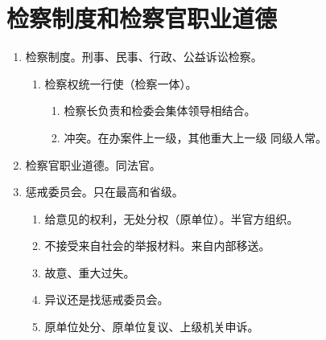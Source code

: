 \section{检察制度和检察官职业道德}
\begin{enumerate}
  \item 检察制度。刑事、民事、行政、公益诉讼检察。
        \begin{enumerate}
          \item 检察权统一行使（检察一体）。
                \begin{enumerate}
                  \item 检察长负责和检委会集体领导相结合。
                  \item 冲突。在办案件上一级，其他重大上一级 \hz 同级人常。
                \end{enumerate}
        \end{enumerate}
  \item 检察官职业道德。同法官。
  \item 惩戒委员会。只在最高和省级。
        \begin{enumerate}
          \item 给意见的权利，无处分权（原单位）。半官方组织。
          \item 不接受来自社会的举报材料。来自内部移送。
          \item 故意、重大过失。
          \item 异议还是找惩戒委员会。
          \item 原单位处分、原单位复议、上级机关申诉。
        \end{enumerate}
\end{enumerate}
